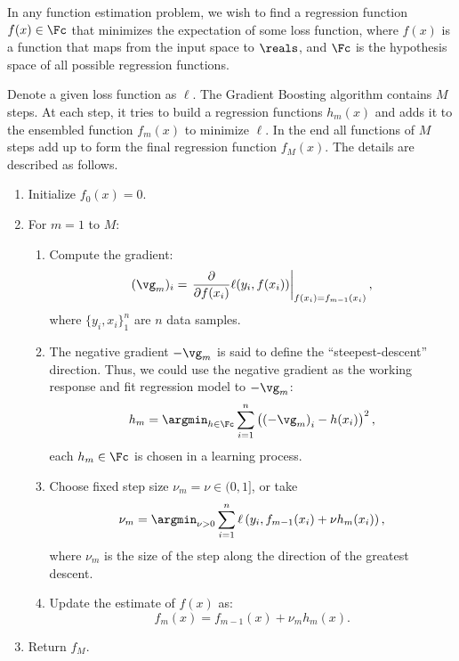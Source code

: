 \documentclass[openany]{ctexbook}
\theoremstyle{kaiti}
\theoremstyle{normal}
\begin{document}
In any function estimation problem, we wish to find a regression function $f(x)\in\Fc$ that minimizes the expectation of some loss function, where $f(x)$ is a function that maps from the input space to $\reals$, and $\Fc$ is the hypothesis space of all possible regression functions.

Denote a given loss function as $\ell$.
The Gradient Boosting algorithm contains $M$ steps. At each step, it tries to build a regression functions $h_m(x)$ and adds it to the ensembled function $f_m(x)$ to minimize $\ell$. In the end all functions of $M$ steps add up to form the final regression function $f_M(x)$. The details are described as follows. 

\begin{enumerate}
  \item Initialize $f_{0}(x)=0$. 
  \item For $m=1$ to $M$:

  \begin{enumerate}
    \item Compute the gradient: 
    \begin{equation}
      ({\vg}_{m})_i=\left.\frac{\partial}{\partial f(x_{i})}\ell(y_{i},f(x_{i})) \right|_{f(x_{i})=f_{m-1}(x_{i})},
    \end{equation}
    where $\{y_i, x_i\}_{1}^{n}$ are $n$ data samples.
    \item The negative gradient $-{\vg}_{m}$ is said to define the ``steepest-descent'' direction. Thus, we could use the negative gradient as the working response and fit regression model to $-{\vg}_{m}$: 
    \begin{equation}
      h_{m}=\argmin_{h\in\Fc}\sum_{i=1}^{n}\left(\left(-{\vg}_{m}\right)_{i}-h(x_{i})\right)^{2},
    \end{equation}
    each $h_m \in \Fc$ is chosen in a learning process.

    \item Choose fixed step size $\nu_{m}=\nu\in(0,1]$, or take 
    \begin{equation}
      \nu_{m}=\argmin_{\nu>0}\sum_{i=1}^{n}\ell\left( y_{i},f_{m-1}(x_{i})+\nu h_{m}(x_{i})\right) ,
    \end{equation}
    where $\nu_{m}$ is the size of the step along the direction of the greatest descent.

    \item Update the estimate of $f(x)$ as: 
    \begin{equation}
      f_{m}(x)=f_{m-1}(x)+\nu_{m}h_{m}(x).
    \end{equation}
  \end{enumerate}
  \item Return $f_{M}$. 
\end{enumerate}
\end{document}
